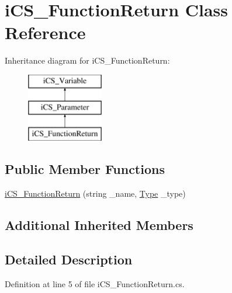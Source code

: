 \hypertarget{classi_c_s___function_return}{\section{i\+C\+S\+\_\+\+Function\+Return Class Reference}
\label{classi_c_s___function_return}
}
Inheritance diagram for i\+C\+S\+\_\+\+Function\+Return\+:\begin{figure}[H]
\begin{center}
\leavevmode
\includegraphics[height=3.000000cm]{classi_c_s___function_return}
\end{center}
\end{figure}
\subsection*{Public Member Functions}
\begin{DoxyCompactItemize}
\item 
\hyperlink{classi_c_s___function_return_a58845480ec0aa1d8dc146f4b80869642}{i\+C\+S\+\_\+\+Function\+Return} (string \+\_\+name, \hyperlink{i_c_s___object_type_enum_8cs_ae6c3dd6d8597380b56d94908eb431547aa1fa27779242b4902f7ae3bdd5c6d508}{Type} \+\_\+type)
\end{DoxyCompactItemize}
\subsection*{Additional Inherited Members}


\subsection{Detailed Description}


Definition at line 5 of file i\+C\+S\+\_\+\+Function\+Return.\+cs.



